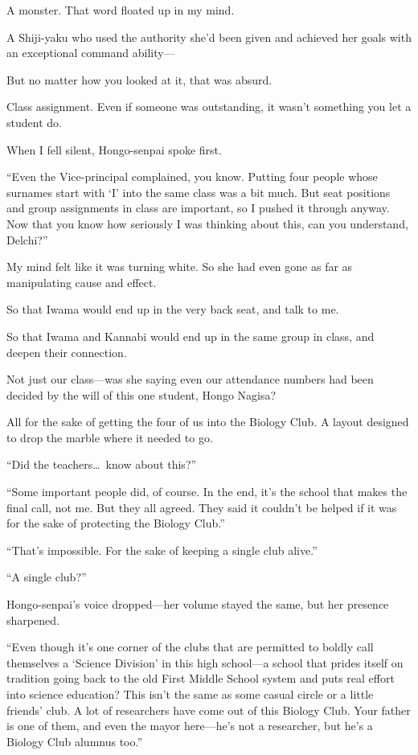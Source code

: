 \documentclass[
    a4paper,
    12pt,
    twoside,
    openany,
    UTF8,
    fontset=windows
]{ctexbook}
\begin{document}
A monster. That word floated up in my mind.

A Shiji-yaku who used the authority she'd been given and achieved her goals with an exceptional command ability---

But no matter how you looked at it, that was absurd.

Class assignment. Even if someone was outstanding, it wasn't something you let a student do.

When I fell silent, Hongo-senpai spoke first.

``Even the Vice-principal complained, you know. Putting four people whose surnames start with `I' into the same class was a bit much. But seat positions and group assignments in class are important, so I pushed it through anyway. Now that you know how seriously I was thinking about this, can you understand, Delchi?''

My mind felt like it was turning white. So she had even gone as far as manipulating cause and effect.

So that Iwama would end up in the very back seat, and talk to me.

So that Iwama and Kannabi would end up in the same group in class, and deepen their connection.

Not just our class---was she saying even our attendance numbers had been decided by the will of this one student, Hongo Nagisa?

All for the sake of getting the four of us into the Biology Club. A layout designed to drop the marble where it needed to go.

``Did the teachers\dots\ know about this?''

``Some important people did, of course. In the end, it's the school that makes the final call, not me. But they all agreed. They said it couldn't be helped if it was for the sake of protecting the Biology Club.''

``That's impossible. For the sake of keeping a single club alive.''

``A single club?''

Hongo-senpai's voice dropped---her volume stayed the same, but her presence sharpened.

``Even though it's one corner of the clubs that are permitted to boldly call themselves a `Science Division' in this high school---a school that prides itself on tradition going back to the old First Middle School system and puts real effort into science education? This isn't the same as some casual circle or a little friends' club. A lot of researchers have come out of this Biology Club. Your father is one of them, and even the mayor here---he's not a researcher, but he's a Biology Club alumnus too.''
\end{document}
